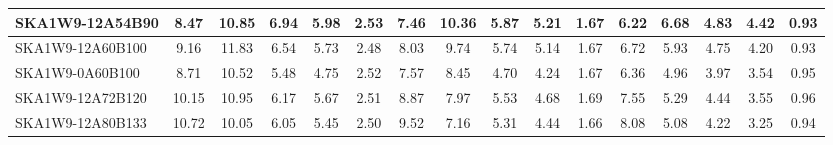 \begin{table}[H]
{{\begin{tabular}{|lccccc||ccccc||ccccc|}
SKA1W9-12A54B90 & 8.47 \cellcolor{blue!18.00} & 10.85 \cellcolor{red!51.17} & 6.94 \cellcolor{green!60.00} & 5.98 \cellcolor{orange!60.00} & 2.53 \cellcolor{purple!27.13} & 7.46 \cellcolor{blue!18.00} & 10.36 \cellcolor{red!60.00} & 5.87 \cellcolor{green!60.00} & 5.21 \cellcolor{orange!60.00} & 1.67 \cellcolor{purple!21.82} & 6.22 \cellcolor{blue!23.83} & 6.68 \cellcolor{red!60.00} & 4.83 \cellcolor{green!60.00} & 4.42 \cellcolor{orange!60.00} & 0.93 \cellcolor{purple!18.00}\\ \hline 
SKA1W9-12A60B100 & 9.16 \cellcolor{blue!30.88} & 11.83 \cellcolor{red!60.00} & 6.54 \cellcolor{green!48.49} & 5.73 \cellcolor{orange!51.46} & 2.48 \cellcolor{purple!18.00} & 8.03 \cellcolor{blue!29.62} & 9.74 \cellcolor{red!54.15} & 5.74 \cellcolor{green!55.33} & 5.14 \cellcolor{orange!56.97} & 1.67 \cellcolor{purple!21.82} & 6.72 \cellcolor{blue!33.56} & 5.93 \cellcolor{red!44.41} & 4.75 \cellcolor{green!56.09} & 4.20 \cellcolor{orange!52.10} & 0.93 \cellcolor{purple!18.00}\\ \hline 
SKA1W9-0A60B100 & 8.71 \cellcolor{blue!22.48} & 10.52 \cellcolor{red!48.19} & 5.48 \cellcolor{green!18.00} & 4.75 \cellcolor{orange!18.00} & 2.52 \cellcolor{purple!25.30} & 7.57 \cellcolor{blue!20.24} & 8.45 \cellcolor{red!41.97} & 4.70 \cellcolor{green!18.00} & 4.24 \cellcolor{orange!18.00} & 1.67 \cellcolor{purple!21.82} & 6.36 \cellcolor{blue!26.56} & 4.96 \cellcolor{red!24.24} & 3.97 \cellcolor{green!18.00} & 3.54 \cellcolor{orange!28.41} & 0.95 \cellcolor{purple!34.80}\\ \hline 
SKA1W9-12A72B120 & 10.15 \cellcolor{blue!49.36} & 10.95 \cellcolor{red!52.07} & 6.17 \cellcolor{green!37.85} & 5.67 \cellcolor{orange!49.41} & 2.51 \cellcolor{purple!23.48} & 8.87 \cellcolor{blue!46.75} & 7.97 \cellcolor{red!37.44} & 5.53 \cellcolor{green!47.79} & 4.68 \cellcolor{orange!37.05} & 1.69 \cellcolor{purple!29.45} & 7.55 \cellcolor{blue!49.69} & 5.29 \cellcolor{red!31.10} & 4.44 \cellcolor{green!40.95} & 3.55 \cellcolor{orange!28.77} & 0.96 \cellcolor{purple!43.20}\\ \hline 
SKA1W9-12A80B133 & 10.72 \cellcolor{blue!60.00} & 10.05 \cellcolor{red!43.96} & 6.05 \cellcolor{green!34.40} & 5.45 \cellcolor{orange!41.90} & 2.50 \cellcolor{purple!21.65} & 9.52 \cellcolor{blue!60.00} & 7.16 \cellcolor{red!29.80} & 5.31 \cellcolor{green!39.90} & 4.44 \cellcolor{orange!26.66} & 1.66 \cellcolor{purple!18.00} & 8.08 \cellcolor{blue!60.00} & 5.08 \cellcolor{red!26.73} & 4.22 \cellcolor{green!30.21} & 3.25 \cellcolor{orange!18.00} & 0.94 \cellcolor{purple!26.40}\\ \hline 

\end{tabular}}}
\end{table}
